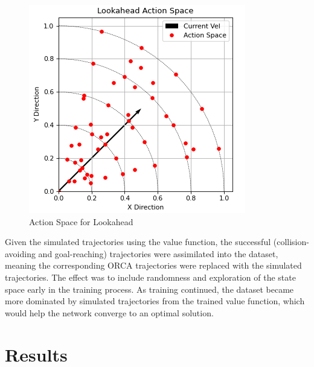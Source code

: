 \documentclass[conference]{IEEEtran}
\begin{document}
\begin{figure}[h!]
    \centering
    \includegraphics[width=0.9\linewidth]{docs/latex/figures/action_space.PNG}
    \caption{Action Space for Lookahead}
    \label{fig:actionspace}
\end{figure}

Given the simulated trajectories using the value function, the successful (collision-avoiding and goal-reaching) trajectories were assimilated into the dataset, meaning the corresponding ORCA trajectories were replaced with the simulated trajectories. The effect was to include randomness and exploration of the state space early in the training process. As training continued, the dataset became more dominated by simulated trajectories from the trained value function, which would help the network converge to an optimal solution.

\section{Results}
\end{document}
